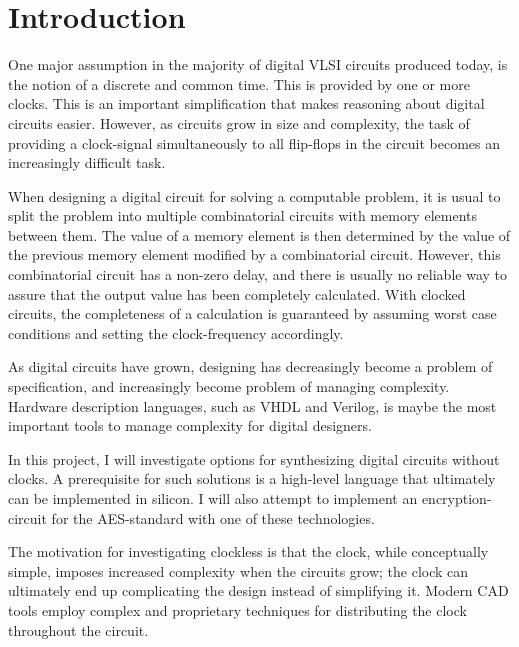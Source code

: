 \section{Introduction}

One major assumption in the majority of digital VLSI circuits produced
today, is the notion of a discrete and common time. This is provided
by one or more clocks. This is an important simplification that makes
reasoning about digital circuits easier. However, as circuits grow in
size and complexity, the task of providing a clock-signal
simultaneously to all flip-flops in the circuit becomes an
increasingly difficult task.

When designing a digital circuit for solving a computable problem, it
is usual to split the problem into multiple combinatorial circuits
with memory elements between them. The value of a memory element is
then determined by the value of the previous memory element modified
by a combinatorial circuit. However, this combinatorial circuit has
a non-zero delay, and there is usually no reliable way to assure that
the output value has been completely calculated. With clocked circuits,
the completeness of a calculation is guaranteed by assuming worst case
conditions and setting the clock-frequency accordingly.

As digital circuits have grown, designing has decreasingly become a
problem of specification, and increasingly become problem of managing
complexity. Hardware description languages, such as VHDL and Verilog,
is maybe the most important tools to manage complexity for digital
designers.

In this project, I will investigate options for synthesizing digital
circuits without clocks. A prerequisite for such solutions is a
high-level language that ultimately can be implemented in silicon. I
will also attempt to implement an encryption-circuit for the
AES-standard with one of these technologies.

The motivation for investigating clockless is that the clock, while
conceptually simple, imposes increased complexity when the circuits
grow; the clock can ultimately end up complicating the design instead
of simplifying it. Modern CAD tools employ complex and proprietary
techniques for distributing the clock throughout the circuit.

